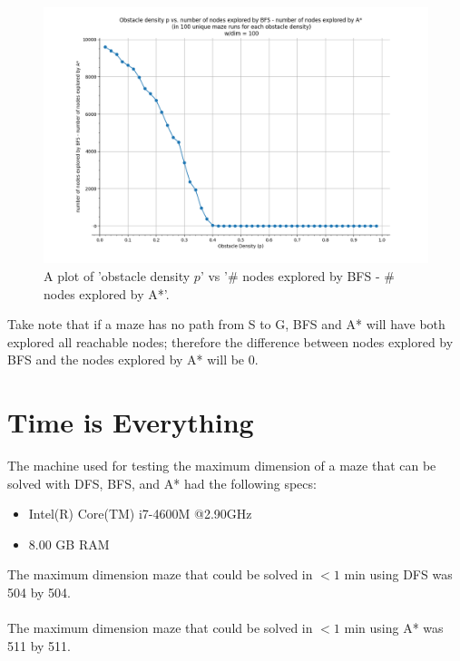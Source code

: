 \documentclass[11pt]{article}
\begin{document}
\begin{figure}[h]
\centering
\includegraphics[scale=0.55]{graphs/obstacleDensity_vs_nodesBFSminusNodesAstar.PNG}
\caption{A plot of 'obstacle density $p$' vs '\# nodes explored by BFS - \# nodes explored by A*'.}
\label{BFS-A}
\end{figure}

Take note that if a maze has no path from S to G, BFS and A* will have both explored all reachable nodes; therefore the difference between nodes explored by BFS and the nodes explored by A* will be 0.
	\pagebreak
\section{Time is Everything}
The machine used for testing the maximum dimension of a maze that can be solved with DFS, BFS, and A* had the following specs:
\begin{itemize}
\item Intel(R) Core(TM) i7-4600M @2.90GHz
\item 8.00 GB RAM
\end{itemize}
The maximum dimension maze that could be solved in $<1$ min using DFS was 504 by 504.\\\\
The maximum dimension maze that could be solved in $<1$ min using A* was 511 by 511.\\
\end{document}
